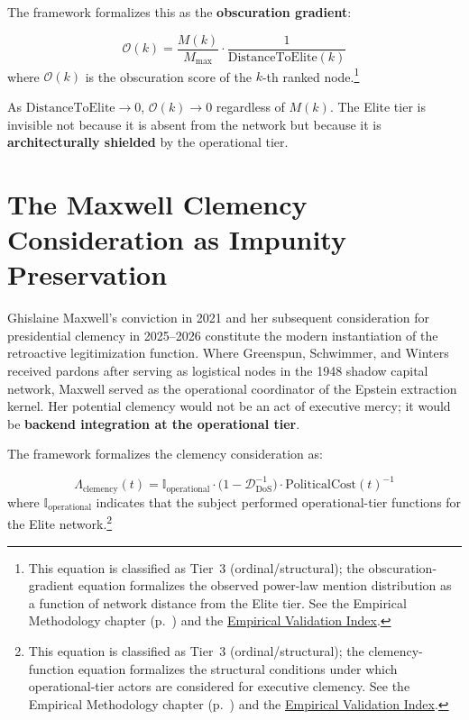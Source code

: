 The framework formalizes this as the \textbf{obscuration gradient}:

\begin{equation}\label{eq:gp12b-obscuration-gradient}
\mathcal{O}(k) = \frac{M(k)}{M_{\text{max}}} \cdot \frac{1}{\text{DistanceToElite}(k)}
\end{equation}
where $\mathcal{O}(k)$ is the obscuration score of the $k$-th ranked node.\footnote{This equation is classified as Tier~3 (ordinal/structural); the obscuration-gradient equation formalizes the observed power-law mention distribution as a function of network distance from the Elite tier. See the Empirical Methodology chapter (p.~\pageref{ch:empirical_methodology}) and the \hyperref[app:empirical_index]{Empirical Validation Index}.}

As $\text{DistanceToElite} \rightarrow 0$, $\mathcal{O}(k) \rightarrow 0$ regardless of $M(k)$. The Elite tier is invisible not because it is absent from the network but because it is \textbf{architecturally shielded} by the operational tier.

\section{The Maxwell Clemency Consideration as Impunity Preservation}

Ghislaine Maxwell's conviction in 2021 and her subsequent consideration for presidential clemency in 2025--2026 constitute the modern instantiation of the retroactive legitimization function. Where Greenspun, Schwimmer, and Winters received pardons after serving as logistical nodes in the 1948 shadow capital network, Maxwell served as the operational coordinator of the Epstein extraction kernel. Her potential clemency would not be an act of executive mercy; it would be \textbf{backend integration at the operational tier}.

The framework formalizes the clemency consideration as:

\begin{equation}\label{eq:gp12c-clemency-function}
\Lambda_{\text{clemency}}(t) = \mathbb{I}_{\text{operational}} \cdot \bigl(1 - \mathcal{D}_{\text{DoS}}^{-1}\bigr) \cdot \text{PoliticalCost}(t)^{-1}
\end{equation}
where $\mathbb{I}_{\text{operational}}$ indicates that the subject performed operational-tier functions for the Elite network.\footnote{This equation is classified as Tier~3 (ordinal/structural); the clemency-function equation formalizes the structural conditions under which operational-tier actors are considered for executive clemency. See the Empirical Methodology chapter (p.~\pageref{ch:empirical_methodology}) and the \hyperref[app:empirical_index]{Empirical Validation Index}.}

